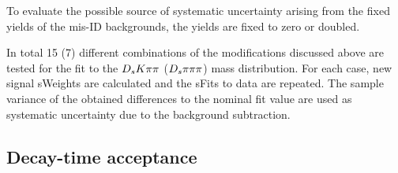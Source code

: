 %
%
%
%
%
To evaluate the possible source of systematic uncertainty arising from the fixed yields of the mis-ID backgrounds, the yields are fixed to zero or doubled.

In total 15 (7) different combinations of the modifications discussed above are tested for the fit to the ${{D}_{s}} {K} {\pi}{\pi}$ (${{D}_{s}} \pi {\ensuremath{\pi}}{\ensuremath{\pi}}$) mass distribution.
For each case, new signal \textsf{sWeights} are calculated and the \textsf{sFits} to data are repeated. 
The sample variance of the obtained differences to the nominal fit value are used as systematic uncertainty due to the background subtraction.


\subsection{Decay-time acceptance}
\label{subsec:SystTime}


